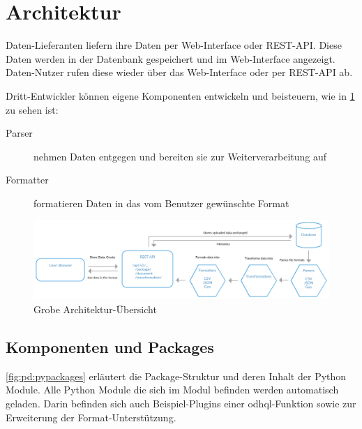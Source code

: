 \section{Architektur}
Daten-Lieferanten liefern ihre Daten per Web-Interface oder REST-API. Diese Daten werden in der Datenbank gespeichert und im Web-Interface angezeigt. Daten-Nutzer rufen diese wieder über das Web-Interface oder per REST-API ab. 

Dritt-Entwickler können eigene Komponenten entwickeln und beisteuern, wie in \cref{fig:pd:arch-overview} zu sehen ist:
\begin{description}
\item[Parser] nehmen Daten entgegen und bereiten sie zur Weiterverarbeitung auf
\item[Formatter] formatieren Daten in das vom Benutzer gewünschte Format
\end{description}

\begin{figure}[H]
    \centering
    \includegraphics[width=\linewidth]{fig/ODH-Architecture-Overview}
    \caption{Grobe Architektur-Übersicht}
    \label{fig:pd:arch-overview}
\end{figure}

\subsection{Komponenten und Packages}
\cref{fig:pd:pypackages} erläutert die Package-Struktur und deren Inhalt der Python Module. Alle Python Module die sich im  Modul befinden werden automatisch geladen. Darin befinden sich auch Beispiel-Plugins einer \acs{odhql}-Funktion sowie zur Erweiterung der Format-Unterstützung.

